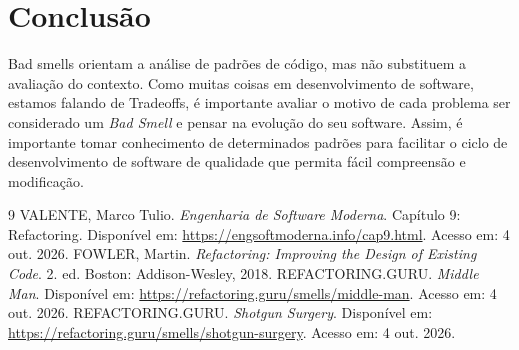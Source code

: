\documentclass[12pt,a4paper]{article}
\newcommand{\smell}[1]{\textit{#1}}
\begin{document}
\section{Conclusão}

Bad smells orientam a análise de padrões de código, mas não substituem a avaliação do contexto. Como muitas coisas em desenvolvimento de software, estamos falando de Tradeoffs, é importante avaliar o motivo de cada problema ser considerado um \smell{Bad Smell} e pensar na evolução do seu software. Assim, é importante tomar conhecimento de determinados padrões para facilitar o ciclo de desenvolvimento de software de qualidade que permita fácil compreensão e modificação.

\begin{thebibliography}{9}
VALENTE, Marco Tulio. \textit{Engenharia de Software Moderna}. Capítulo 9: Refactoring. Disponível em: \url{https://engsoftmoderna.info/cap9.html}. Acesso em: 4 out. 2026.
FOWLER, Martin. \textit{Refactoring: Improving the Design of Existing Code}. 2. ed. Boston: Addison-Wesley, 2018.
REFACTORING.GURU. \textit{Middle Man}. Disponível em: \url{https://refactoring.guru/smells/middle-man}. Acesso em: 4 out. 2026.
REFACTORING.GURU. \textit{Shotgun Surgery}. Disponível em: \url{https://refactoring.guru/smells/shotgun-surgery}. Acesso em: 4 out. 2026.
\end{thebibliography}
\end{document}
